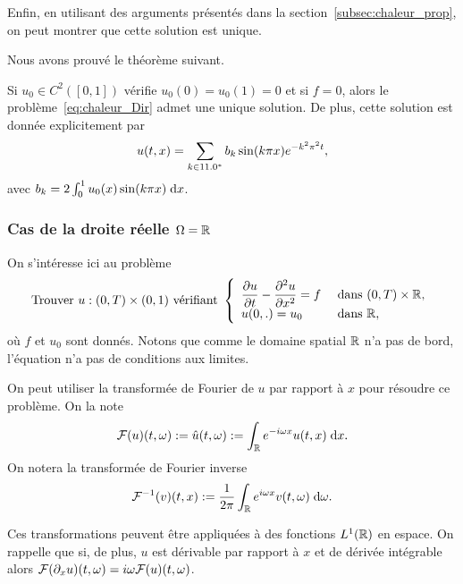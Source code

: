 \documentclass[12pt,a4paper,twoside]{article}
\begin{document}
Enfin, en utilisant des arguments pr\'esent\'es dans la section~\ref{subsec:chaleur_prop},
on peut montrer que cette solution est unique.

Nous avons prouv\'e le th\'eor\`eme suivant.
\begin{theorem}
  Si $u_0 \in C^2([0,1])$ v\'erifie $u_0(0) = u_0(1) = 0$ et si $f=0$,
  alors le probl\`eme~\eqref{eq:chaleur_Dir} admet une unique solution.
  De plus, cette solution est donn\'ee explicitement par
  \begin{align*}
    u(t,x) = \sum_{k\in11.0^*} b_k \sin(k \pi x) e^{- k^2 \pi^2 t} ,
  \end{align*}
  avec
  $b_k = 2 \int_{0}^1 u_0(x) \sin(k \pi x) \;\mathrm{d} x$.
\end{theorem}




\subsubsection{Cas de la droite r\'eelle $\Omega = \mathbb{R}$}


On s'int\'eresse ici au probl\`eme
\begin{equation}
  \label{eq:chaleur_R}
  \text{Trouver $u : (0,T) \times (0,1) $ v\'erifiant  }
  \left\{
    \begin{array}{l l}
      \dfrac{\partial u}{\partial t} - \dfrac{\partial^2 u}{\partial x^2} = f 
      &\text{ dans } (0,T) \times \mathbb{R} ,
      \\
      u(0,.) = u_0 
      & \text{ dans } \mathbb{R} ,
    \end{array}
  \right.
\end{equation}
o\`u $f$ et $u_0$ sont donn\'es.
Notons que comme le domaine spatial $\mathbb{R}$ n'a pas de bord, l'\'equation 
n'a pas de conditions aux limites.


On peut utiliser la transform\'ee de Fourier de $u$ par rapport \`a $x$ 
pour r\'esoudre ce probl\`eme. On la note
\begin{align*}
  \mathcal{F}(u)(t,\omega) := \hat u(t,\omega) := \int_{\mathbb{R}} e^{- i \omega x} u(t,x) \;\mathrm{d} x .
\end{align*}
On notera la transform\'ee de Fourier inverse
\begin{align*}
  \mathcal{F}^{-1}(v)(t,x) := \dfrac{1}{2\pi} \int_{\mathbb{R}} e^{i \omega x} v(t,\omega) \;\mathrm{d} \omega .
\end{align*}

Ces transformations peuvent \^etre appliqu\'ees \`a des fonctions $L^1(\mathbb{R})$ en espace.
On rappelle que si, de plus, $u$ est d\'erivable par rapport \`a $x$ et de d\'eriv\'ee
int\'egrable alors $\mathcal{F}(\partial_x u)(t,\omega) = i \omega \mathcal{F}(u)(t,\omega)$.
\end{document}
